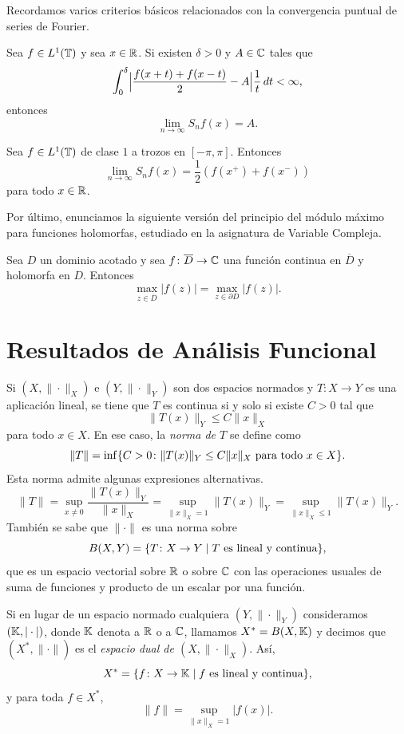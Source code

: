 \documentclass[a4paper, 12pt, oneside]{book}
\begin{document}
Recordamos varios criterios básicos relacionados con la convergencia puntual de series de Fourier.

\begin{theorem}\label{1.2.10}
    Sea $f \in L^1(\mathbb T)$ y sea $x \in \mathbb R$. Si existen $\delta > 0$ y $A \in \mathbb C$ tales que
    \[\int_{0}^{\delta} \Bigl|\frac{f(x+t)+f(x-t)}{2}-A\Bigr|\frac{1}{t} \, dt < \infty,\]
    entonces
    \[\lim_{n\to\infty}S_nf(x) = A.\]
\end{theorem}

\begin{theorem}\label{1.2.11}
    Sea $f \in L^1(\mathbb T)$ de clase $1$ a trozos en $[-\pi,\pi]$. Entonces
    \[\lim_{n\to\infty}S_nf(x) = \frac{1}{2}(f(x^+)+f(x^-))\]
    para todo $x \in \mathbb R$.
\end{theorem}

Por último, enunciamos la siguiente versión del principio del módulo máximo para funciones holomorfas, estudiado en la asignatura de Variable Compleja.

\begin{theorem}\label{1.2.12}
    Sea $D$ un dominio acotado y sea $f \colon \overline{D} \to \mathbb C$ una función continua en $\overline{D}$ y holomorfa en $D$. Entonces
    \[\max_{z\in\overline{D}}|f(z)| = \max_{z \in \partial D}|f(z)|.\]
\end{theorem}

\section{Resultados de Análisis Funcional}

Si $(X,\|\cdot\|_X)$ e $(Y,\|\cdot\|_Y)$ son dos espacios normados y $T \colon X \to Y$ es una aplicación lineal, se tiene que $T$ es continua si y solo si existe $C > 0$ tal que
\[\|T(x)\|_Y \leq C\|x\|_X\]
para todo $x \in X$. En ese caso, la \emph{norma de $T$} se define como
\[\|T\| = \inf\{C > 0 \colon \|T(x)\|_Y \leq C\|x\|_X \textup{ para todo } x \in X\}.\]
Esta norma admite algunas expresiones alternativas.
\[\|T\| = \sup_{x \neq 0} \frac{\|T(x)\|_Y}{\|x\|_X} = \sup_{\|x\|_X = 1} \|T(x)\|_Y = \sup_{\|x\|_X \leq 1} \|T(x)\|_Y.\]
También se sabe que $\|\cdot\|$ es una norma sobre
\[B(X,Y) = \{T \colon X \to Y \mid T \textup{ es lineal y continua}\},\]
que es un espacio vectorial sobre $\mathbb R$ o sobre $\mathbb C$ con las operaciones usuales de suma de funciones y producto de un escalar por una función.

Si en lugar de un espacio normado cualquiera $(Y,\|\cdot\|_Y)$ consideramos $(\mathbb K,|\cdot|)$, donde $\mathbb K$ denota a $\mathbb R$ o a $\mathbb C$, llamamos $X^* = B(X,\mathbb K)$ y decimos que $(X^*,\|\cdot\|)$ es el \emph{espacio dual de $(X,\|\cdot\|_X)$}. Así,
\[X^* = \{f \colon X \to \mathbb K \mid f \textup{ es lineal y continua}\},\]
y para toda $f \in X^*$,
\[\|f\| = \sup_{\|x\|_X=1}|f(x)|.\]
\end{document}
